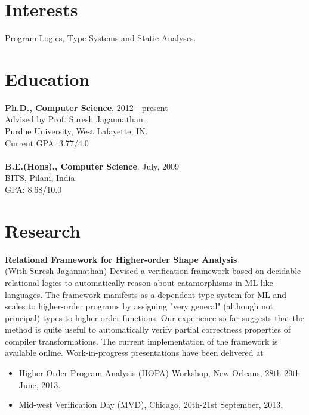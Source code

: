 \documentclass[margin,line]{res}
\begin{document}
 
 
 
\address{http://gowthamk.github.io \hspace{1.25in} gkaki@cs.purdue.edu
          \hspace{1.25in} (201) 417 1775 }

 
\begin{resume} 
 
\section{Interests} 
Program Logics, Type Systems and Static Analyses.

\section{Education} 
{\bf Ph.D., Computer Science}. \hfill 2012 - present\\
Advised by Prof. Suresh Jagannathan.\\
Purdue University, West Lafayette, IN.\\
Current GPA: 3.77/4.0 \\
\\
{\bf B.E.(Hons)., Computer Science}. \hfill July, 2009\\
BITS, Pilani, India.\\
GPA: 8.68/10.0
 

\section{Research}
 {\bf Relational Framework for Higher-order Shape Analysis} \\
 (With Suresh Jagannathan) Devised a verification framework based on
 decidable relational logics to automatically reason about
 catamorphisms in ML-like languages. The framework manifests as a
 dependent type system for ML and scales to higher-order programs by
 assigning "very general" (although not principal) types to
 higher-order functions. Our experience so far suggests that the
 method is quite useful to automatically verify partial correctness
 properties of compiler transformations. The current implementation of
 the framework is available online. Work-in-progress presentations
 have been delivered at 
 \begin{itemize} \itemsep -2pt  %
 \item Higher-Order Program Analysis (HOPA) Workshop, New Orleans,
 28th-29th June, 2013.
 \item Mid-west Verification Day (MVD), Chicago, 20th-21st September,
 2013.
 \end{itemize}


\end{resume}
\end{document}
